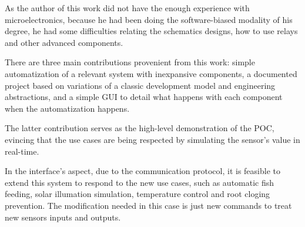 
As the author of this work did not have the enough experience with microelectronics,
because he had been doing the software-biased modality of his degree,
he had some difficulties relating the schematics designs,
how to use relays and other advanced components.

There are three main contributions provenient from this work: 
simple automatization of a relevant system with inexpansive components,
a documented project based on variations of a classic development model and engineering abstractions,
and a simple GUI to detail what happens with each component when the automatization happens.

The latter contribution serves as the high-level demonstration of the POC,
evincing that the use cases are being respected by simulating the sensor's value in real-time.

In the interface's aspect,
due to the communication protocol,
it is feasible to extend this system to respond to the new use cases,
such as automatic fish feeding,
solar illumation simulation,
temperature control and root cloging prevention.
The modification needed in this case is just new commands to treat new sensors inputs and outputs.
